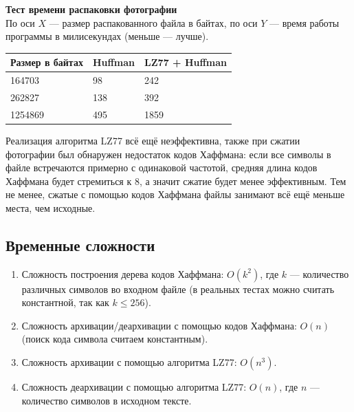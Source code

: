 \documentclass[12pt]{article}
\begin{document}
    \textbf{Тест времени распаковки фотографии} \\
    По оси $X$ — размер распакованного файла в байтах, по оси $Y$ — время 
    работы программы в милисекундах (меньше — лучше).


    \begin{tabular}{ | l | l | l | }
        \hline
            Размер в байтах & Huffman & LZ77 + Huffman \\ \hline
            164703          & 98      & 242            \\
            262827          & 138     & 392            \\
            1254869         & 495     & 1859           \\
        \hline
    \end{tabular}

    Реализация алгоритма LZ77 всё ещё неэффективна, также при сжатии фотографии 
    был обнаружен недостаток кодов Хаффмана: если все символы в файле 
    встречаются примерно с одинаковой частотой, средняя длина кодов Хаффмана 
    будет стремиться к 8, а значит сжатие будет менее эффективным. Тем не 
    менее, сжатые с помощью кодов Хаффмана файлы занимают всё ещё меньше места, 
    чем исходные. 

    \subsection*{Временные сложности}
    \begin{enumerate}
        \item Сложность построения дерева кодов Хаффмана: $O(k^2)$, где $k$ — 
        количество различных символов во входном файле (в реальных тестах 
        можно считать константной, так как $k \leq 256$).
        \item Сложность архивации/деархивации с помощью кодов Хаффмана: $O(n)$ 
        (поиск кода символа считаем константным).
        \item Сложность архивации с помощью алгоритма LZ77: $O(n^3)$.
        \item Сложность деархивации с помощью алгоритма LZ77: $O(n)$, где 
        $n$ — количество символов в исходном тексте.
    \end{enumerate}    
\end{document}
